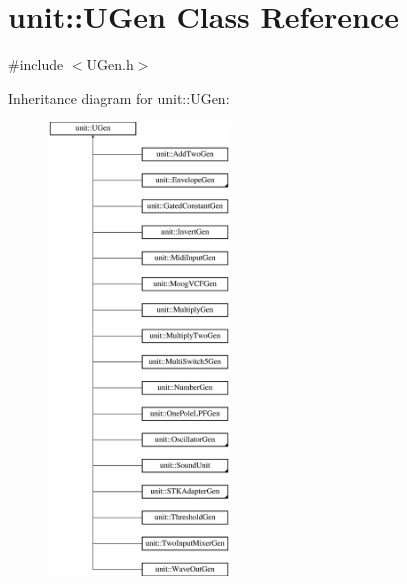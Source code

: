 \hypertarget{classunit_1_1UGen}{\section{unit\-:\-:U\-Gen Class Reference}
\label{classunit_1_1UGen}
}


{\ttfamily \#include $<$U\-Gen.\-h$>$}

Inheritance diagram for unit\-:\-:U\-Gen\-:\begin{figure}[H]
\begin{center}
\leavevmode
\includegraphics[height=12.000000cm]{classunit_1_1UGen}
\end{center}
\end{figure}
